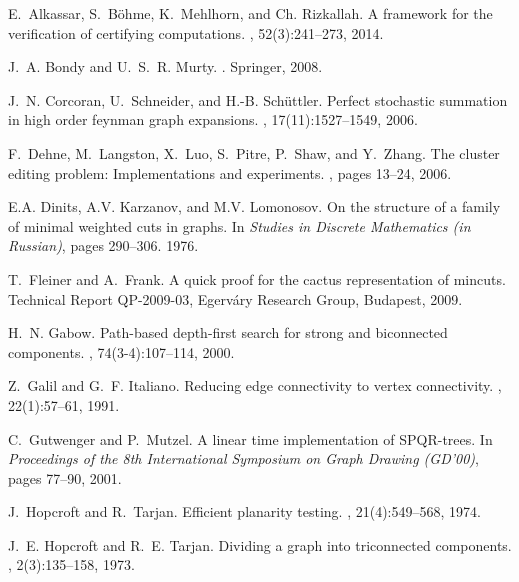 \documentclass[paper=a4]{scrartcl}
\begin{document}
\begin{thebibliography}{10}

E.~Alkassar, S.~B\"ohme, K.~Mehlhorn, and Ch. Rizkallah.
\newblock A framework for the verification of certifying computations.
, 52(3):241--273, 2014.

J.~A. Bondy and U.~S.~R. Murty.
.
\newblock Springer, 2008.

J.~N. Corcoran, U.~Schneider, and H.-B. Sch{\"u}ttler.
\newblock Perfect stochastic summation in high order feynman graph expansions.
, 17(11):1527--1549,
  2006.

F.~Dehne, M.~Langston, X.~Luo, S.~Pitre, P.~Shaw, and Y.~Zhang.
\newblock The cluster editing problem: Implementations and experiments.
, pages 13--24, 2006.

E.A. Dinits, A.V. Karzanov, and M.V. Lomonosov.
\newblock On the structure of a family of minimal weighted cuts in graphs.
\newblock In {\em Studies in Discrete Mathematics (in Russian)}, pages
  290--306. 1976.

T.~Fleiner and A.~Frank.
\newblock A quick proof for the cactus representation of mincuts.
\newblock Technical Report QP-2009-03, Egerv{\'a}ry Research Group, Budapest,
  2009.

H.~N. Gabow.
\newblock Path-based depth-first search for strong and biconnected components.
, 74(3-4):107--114, 2000.

Z.~Galil and G.~F. Italiano.
\newblock Reducing edge connectivity to vertex connectivity.
, 22(1):57--61, 1991.

C.~Gutwenger and P.~Mutzel.
\newblock A linear time implementation of {SPQR}-trees.
\newblock In {\em Proceedings of the 8th International Symposium on Graph
  Drawing (GD'00)}, pages 77--90, 2001.

J.~Hopcroft and R.~Tarjan.
\newblock Efficient planarity testing.
, 21(4):549--568, 1974.

J.~E. Hopcroft and R.~E. Tarjan.
\newblock Dividing a graph into triconnected components.
, 2(3):135--158, 1973.


\end{thebibliography}
\end{document}
